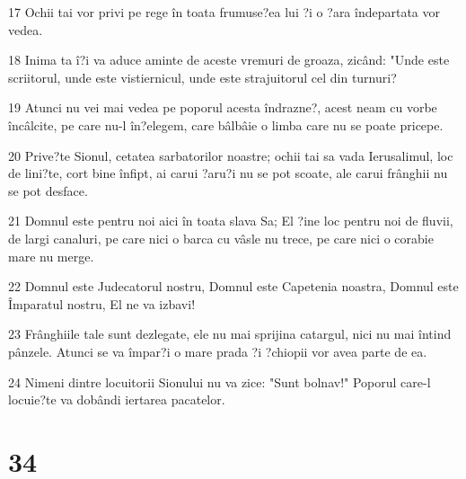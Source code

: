 \par 17 Ochii tai vor privi pe rege în toata frumuse?ea lui ?i o ?ara îndepartata vor vedea.
\par 18 Inima ta î?i va aduce aminte de aceste vremuri de groaza, zicând: "Unde este scriitorul, unde este vistiernicul, unde este strajuitorul cel din turnuri?
\par 19 Atunci nu vei mai vedea pe poporul acesta îndrazne?, acest neam cu vorbe încâlcite, pe care nu-l în?elegem, care bâlbâie o limba care nu se poate pricepe.
\par 20 Prive?te Sionul, cetatea sarbatorilor noastre; ochii tai sa vada Ierusalimul, loc de lini?te, cort bine înfipt, ai carui ?aru?i nu se pot scoate, ale carui frânghii nu se pot desface.
\par 21 Domnul este pentru noi aici în toata slava Sa; El ?ine loc pentru noi de fluvii, de largi canaluri, pe care nici o barca cu vâsle nu trece, pe care nici o corabie mare nu merge.
\par 22 Domnul este Judecatorul nostru, Domnul este Capetenia noastra, Domnul este Împaratul nostru, El ne va izbavi!
\par 23 Frânghiile tale sunt dezlegate, ele nu mai sprijina catargul, nici nu mai întind pânzele. Atunci se va împar?i o mare prada ?i ?chiopii vor avea parte de ea.
\par 24 Nimeni dintre locuitorii Sionului nu va zice: "Sunt bolnav!" Poporul care-l locuie?te va dobândi iertarea pacatelor.

\chapter{34}

